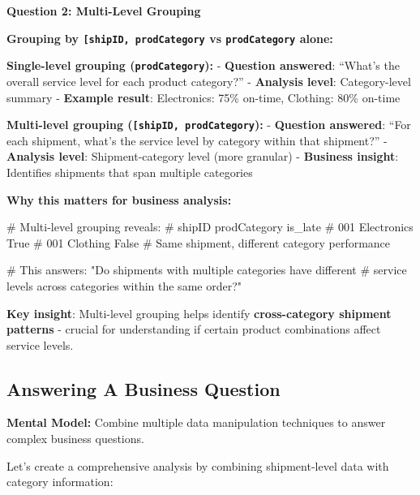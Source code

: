 \documentclass[
  letterpaper,
  DIV=11,
  numbers=noendperiod]{scrartcl}
\newenvironment{Shaded}{\begin{snugshade}}{\end{snugshade}}
\newcommand{\CommentTok}[1]{\textcolor[rgb]{0.37,0.37,0.37}{#1}}
\begin{document}
\textbf{Question 2: Multi-Level Grouping}

\textbf{Grouping by
\texttt{{[}\textquotesingle{}shipID\textquotesingle{},\ \textquotesingle{}prodCategory\textquotesingle{}{]}}
vs \texttt{\textquotesingle{}prodCategory\textquotesingle{}} alone:}

\textbf{Single-level grouping
(\texttt{\textquotesingle{}prodCategory\textquotesingle{}}):} -
\textbf{Question answered}: ``What's the overall service level for each
product category?'' - \textbf{Analysis level}: Category-level summary -
\textbf{Example result}: Electronics: 75\% on-time, Clothing: 80\%
on-time

\textbf{Multi-level grouping
(\texttt{{[}\textquotesingle{}shipID\textquotesingle{},\ \textquotesingle{}prodCategory\textquotesingle{}{]}}):}
- \textbf{Question answered}: ``For each shipment, what's the service
level by category within that shipment?'' - \textbf{Analysis level}:
Shipment-category level (more granular) - \textbf{Business insight}:
Identifies shipments that span multiple categories

\textbf{Why this matters for business analysis:}

\begin{Shaded}
\begin{Highlighting}[]
\CommentTok{\# Multi{-}level grouping reveals:}
\CommentTok{\# shipID  prodCategory  is\_late}
\CommentTok{\# 001     Electronics   True}
\CommentTok{\# 001     Clothing      False  \# Same shipment, different category performance}

\CommentTok{\# This answers: "Do shipments with multiple categories have different }
\CommentTok{\# service levels across categories within the same order?"}
\end{Highlighting}
\end{Shaded}

\textbf{Key insight}: Multi-level grouping helps identify
\textbf{cross-category shipment patterns} - crucial for understanding if
certain product combinations affect service levels.

\subsection{Answering A Business
Question}\label{answering-a-business-question}

\textbf{Mental Model:} Combine multiple data manipulation techniques to
answer complex business questions.

Let's create a comprehensive analysis by combining shipment-level data
with category information:
\end{document}
